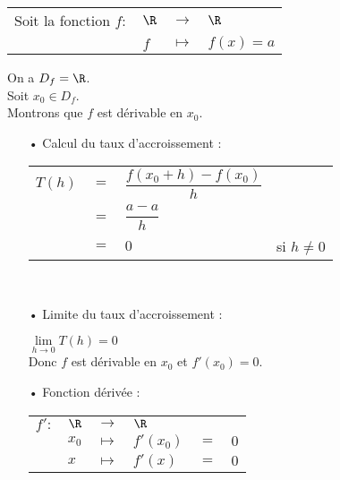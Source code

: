 \begin{tabular}{llll}
Soit la fonction $f :$ & $\R$ & $\longrightarrow$ & $\R$ \\
& $f$ & $\longmapsto$ & $f(x) = a$ \\
\end{tabular}

On a $D_f = \R$. \\

Soit $x_0 \in D_f$. \\

Montrons que $f$ est dérivable en $x_0$. \\

\begin{itemize}
\item[•] Calcul du taux d'accroissement : \vspace*{.3cm}
\\
\begin{tabular}{llll}
$T(h)$ & $=$ & $\dfrac{f(x_0 + h) - f(x_0)}{h}$ & \vspace*{.3cm} \\
& $=$ & $\dfrac{a - a}{h}$ & \vspace*{.3cm} \\
& $=$ & $0$ & si $h \neq 0$ \\
\end{tabular} \\
\vspace*{.3cm}

\item[•] Limite du taux d'accroissement : \vspace*{.3cm}

$\lim\limits_{h \to 0} T(h) = 0$ \\

Donc $f$ est dérivable en $x_0$ et $f'(x_0) = 0$. \\

\item[•] Fonction dérivée : \\

\begin{tabular}{llllll}
$f' :$ & $\R$ & $\longrightarrow$ & $\R$ & & \\
& $x_0$ & $\longmapsto$ & $f'(x_0)$ & $ = $ & $0$ \\
& $x$ & $\longmapsto$ & $f'(x)$ & $ = $ & $0$ \vspace*{.3cm} \\
\end{tabular}
\end{itemize}

